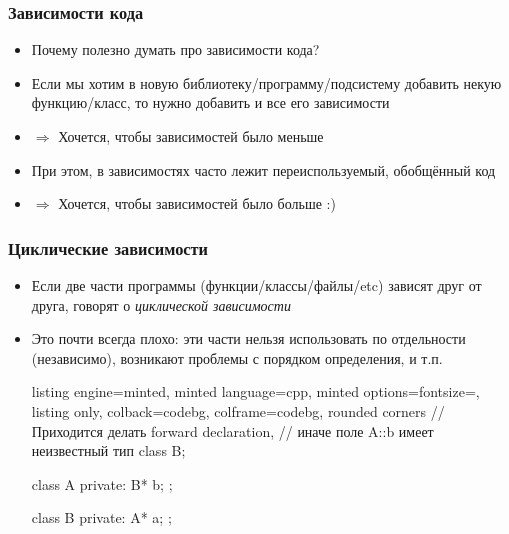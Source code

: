 \documentclass[10pt]{beamer}
\begin{document}
\begin{frame}[fragile]
\frametitle{Зависимости кода}
\begin{itemize}
\item Почему полезно думать про зависимости кода?
\pause
\item Если мы хотим в новую библиотеку/программу/подсистему добавить некую функцию/класс, то нужно добавить и все его зависимости
\pause
\item \(\Longrightarrow\) Хочется, чтобы зависимостей было меньше
\pause
\item При этом, в зависимостях часто лежит переиспользуемый, обобщённый код
\pause
\item \(\Longrightarrow\) Хочется, чтобы зависимостей было больше :)
\end{itemize}
\end{frame}

\begin{frame}[fragile]
\frametitle{Циклические зависимости}
\begin{itemize}
\item Если две части программы (функции/классы/файлы/etc) зависят друг от друга, говорят о \textit{циклической зависимости}
\pause
\item Это почти всегда плохо: эти части нельзя использовать по отдельности (независимо), возникают проблемы с порядком определения, и т.п.
\begin{tcblisting}{listing engine=minted, minted language=cpp, minted options={fontsize=\scriptsize}, listing only, colback=codebg, colframe=codebg, rounded corners}
// Приходится делать forward declaration,
// иначе поле A::b имеет неизвестный тип
class B;

class A {
private:
  B* b;
};

class B {
private:
  A* a;
};
\end{tcblisting}
\end{itemize}
\end{frame}
\end{document}
